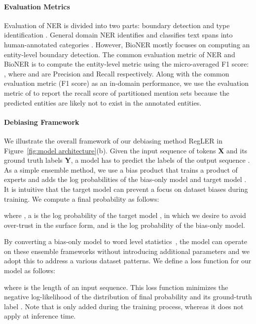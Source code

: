 \documentclass[11pt]{article}
\begin{document}
\paragraph{Evaluation Metrics}
Evaluation of NER is divided into two parts: boundary detection and type identification \cite{li2020survey}.
General domain NER identifies and classifies text spans into human-annotated categories \cite{sang2003introduction}.
However, BioNER mostly focuses on computing an entity-level boundary detection.
The common evaluation metric of NER and BioNER is to compute the entity-level metric using the micro-averaged F1 score:
, where  and  are Precision and Recall respectively.
Along with the common evaluation metric (F1 score) as an in-domain performance, we use the evaluation metric of \cite{kim2021your} to report the recall score of partitioned mention sets because the predicted entities are likely not to exist in the annotated entities.


\paragraph{Debiasing Framework}
We illustrate the overall framework of our debiasing method RegLER in Figure~\ref{fig:model architecture}(b).
Given the input sequence of tokens \textbf{X} and its ground truth labels \textbf{Y}, a model has to predict the labels of the output sequence .
As a simple ensemble method, we use a bias product that trains a product of experts \cite{hinton2002training,smith2005logarithmic} and adds the log probabilities of the bias-only model and target model  \cite{clark2019don,he2019unlearn}.
It is intuitive that the target model can prevent a focus on dataset biases during training.
We compute a final probability as follows:


where , a  is the log probability of the target model , in which we desire to avoid over-trust in the surface form, and  is the log probability of the bias-only model.



By converting a bias-only model to word level  statistics~\cite{ko2020look, kim2021your}, the model can operate on these ensemble frameworks without introducing additional parameters and we adopt this to address a various dataset patterns.
We define a loss function for our model as follows:



where  is the length of an input sequence.
This loss function minimizes the negative log-likelihood of the distribution of final probability  and its ground-truth label .
Note that  is only added during the training process, whereas it does not apply at inference time.
\end{document}

